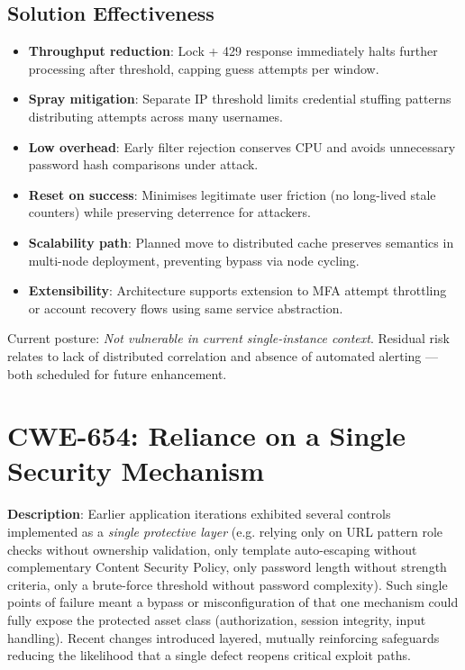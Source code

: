 \documentclass[]{UCD_CS_FYP_Report}
\begin{document}
\subsection*{Solution Effectiveness}
\begin{itemize}
	\item \textbf{Throughput reduction}: Lock + 429 response immediately halts further processing after threshold, capping guess attempts per window.
	\item \textbf{Spray mitigation}: Separate IP threshold limits credential stuffing patterns distributing attempts across many usernames.
	\item \textbf{Low overhead}: Early filter rejection conserves CPU and avoids unnecessary password hash comparisons under attack.
	\item \textbf{Reset on success}: Minimises legitimate user friction (no long-lived stale counters) while preserving deterrence for attackers.
	\item \textbf{Scalability path}: Planned move to distributed cache preserves semantics in multi-node deployment, preventing bypass via node cycling.
	\item \textbf{Extensibility}: Architecture supports extension to MFA attempt throttling or account recovery flows using same service abstraction.
\end{itemize}

Current posture: \textit{Not vulnerable in current single-instance context}. Residual risk relates to lack of distributed correlation and absence of automated alerting — both scheduled for future enhancement.


\section{CWE-654: Reliance on a Single Security Mechanism}

	\textbf{Description}: Earlier application iterations exhibited several controls implemented as a \textit{single protective layer} (e.g. relying only on URL pattern role checks without ownership validation, only template auto-escaping without complementary Content Security Policy, only password length without strength criteria, only a brute-force threshold without password complexity). Such single points of failure meant a bypass or misconfiguration of that one mechanism could fully expose the protected asset class (authorization, session integrity, input handling). Recent changes introduced layered, mutually reinforcing safeguards reducing the likelihood that a single defect reopens critical exploit paths.
\end{document}
